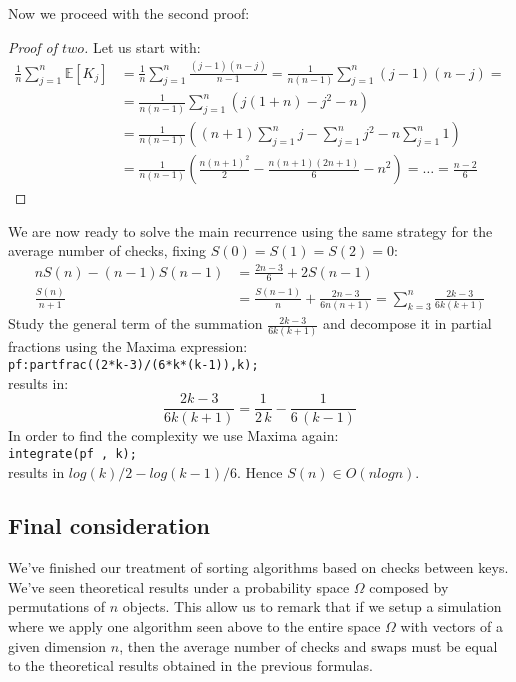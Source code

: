 Now we proceed with the second proof:
\begin{proof}[Proof of $two$]
  Let us start with:
  \begin{displaymath}
    \begin{split}
      \frac{1}{n}\sum_{j=1}^{n}{\mathbb{E} \left[K_j \right] } &=
      \frac{1}{n} \sum_{j=1}^{n}{\frac{(j-1)(n-j)}{n-1}} =
      \frac{1}{n(n-1)} \sum_{j=1}^{n}{(j-1)(n-j)}=\\
      &=\frac{1}{n(n-1)} \sum_{j=1}^{n}{(j(1+n)-j^2-n)} \\
      &=\frac{1}{n(n-1)} \left( (n+1)\sum_{j=1}^{n}{j} -
        \sum_{j=1}^{n}{j^2} -n \sum_{j=1}^{n}{1}  \right)\\
      &=\frac{1}{n(n-1)}\left( \frac{n(n+1)^2}{2} -
        \frac{n(n+1)(2n+1)}{6} - n^2 \right) = \ldots =  \frac{n-2}{6} 
    \end{split}
  \end{displaymath} 
\end{proof}

We are now ready to solve the main recurrence using the same strategy
for the average number of checks, fixing $S(0) = S(1) = S(2) =
0$:
\begin{displaymath}
  \begin{split}
    nS(n) - (n-1)S(n-1) &=  \frac{2n-3}{6} + 2S(n-1)\\
    \frac{S(n)}{n+1} &=  \frac{S(n-1)}{n} +  \frac{2n -3}{6n(n+1)} =
      \sum_{k=3}^{n}{ \frac{2k-3}{6k(k+1)} }  
  \end{split}
\end{displaymath}
Study the general term of the summation $ \frac{2k-3}{6k(k+1)}$ and
decompose it in partial fractions using the Maxima expression:
\\\texttt{pf:partfrac((2*k-3)/(6*k*(k-1)),k);}\\
results in:
\begin{displaymath}
   \frac{2k-3}{6k(k+1)} = \frac{1}{2\,k}-\frac{1}{6\,\left( k-1\right) }
\end{displaymath}
In order to find the complexity we use Maxima again:
\\\texttt{integrate(pf , k);}\\
results in $ log(k)/2-log(k-1)/6$. Hence $S(n) \in O(n logn)$.


\subsection{Final consideration}

We've finished our treatment of sorting algorithms based on checks
between keys. We've seen theoretical results under a probability space
$\Omega$ composed by permutations of $n$ objects. This allow us to
remark that if we setup a simulation where we apply one algorithm seen
above to the entire space $\Omega$ with vectors of a given dimension
$n$, then the average number of checks and swaps must be equal to the
theoretical results obtained in the previous formulas.
